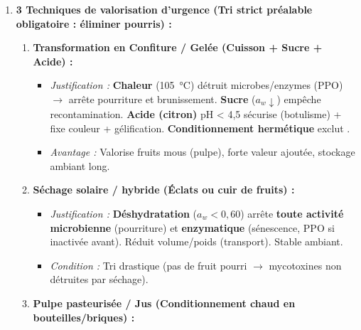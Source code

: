 \documentclass[11pt]{article}
\begin{document}
\begin{exoresolu}
\begin{enumerate}
\begin{enumerate}
                \item \textbf{Noircissement peau aux contacts :} \textbf{Brunissement enzymatique (Polyphénol Oxydase - PPO).} Mécanisme : Chocs/pressions (contacts) $\rightarrow$ rupture vacuoles $\rightarrow$ mise en contact PPO (cytoplasme) + Substrats phénoliques (vacuole) +  (air) $\rightarrow$ Oxydation $\rightarrow$ Quinones $\rightarrow$ Polymérisation $\rightarrow$ Mélanines (brun/noir). Facteur déclencheur : Blessure mécanique.
            \end{enumerate}
        \item \textbf{3 Techniques de valorisation d'urgence (Tri strict préalable obligatoire : éliminer pourris) :}
            \begin{enumerate}
                \item \textbf{Transformation en Confiture / Gelée (Cuisson + Sucre + Acide) :}
                    \begin{itemize}
                        \item \emph{Justification :} \textbf{Chaleur} (\SI{105}{\celsius}) détruit microbes/enzymes (PPO) $\rightarrow$ arrête pourriture et brunissement. \textbf{Sucre} ($a_w \downarrow$) empêche recontamination. \textbf{Acide (citron)} pH < 4,5 sécurise (botulisme) + fixe couleur + gélification. \textbf{Conditionnement hermétique} exclut .
                        \item \emph{Avantage :} Valorise fruits mous (pulpe), forte valeur ajoutée, stockage ambiant long.
                    \end{itemize}
                \item \textbf{Séchage solaire / hybride (Éclats ou cuir de fruits) :}
                    \begin{itemize}
                        \item \emph{Justification :} \textbf{Déshydratation} ($a_w < 0,60$) arrête \textbf{toute activité microbienne} (pourriture) et \textbf{enzymatique} (sénescence, PPO si inactivée avant). Réduit volume/poids (transport). Stable ambiant.
                        \item \emph{Condition :} Tri drastique (pas de fruit pourri $\rightarrow$ mycotoxines non détruites par séchage).
                    \end{itemize}
                \item \textbf{Pulpe pasteurisée / Jus (Conditionnement chaud en bouteilles/briques) :}
                    \begin{itemize}

\end{itemize}
\end{enumerate}
\end{enumerate}
\end{exoresolu}
\end{document}
